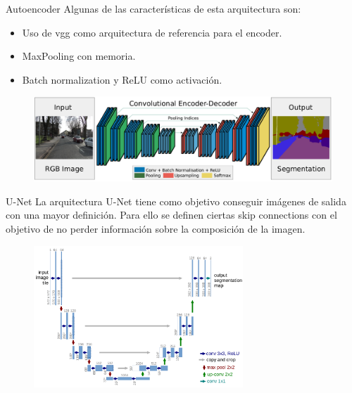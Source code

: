 \begin{frame}{Autoencoder}
Algunas de las características de esta arquitectura son:
\begin{itemize}
    \item Uso de \alert{\gls{vgg}} como arquitectura de referencia para el \alert{encoder}.
    \item MaxPooling \alert{con memoria}.
    \item \alert{Batch normalization} y \alert{ReLU} como activación.
\end{itemize}

\begin{figure}
    \centering
    \includegraphics[width=\textwidth]{figures/Tema 4/SegNet.png}
    \caption{\cite{badrinarayanan2015segnet}}
\end{figure}
\end{frame}

\begin{frame}{U-Net}
La arquitectura \alert{U-Net}\cite{ronneberger2015u} tiene como objetivo conseguir \alert{imágenes de salida} con una mayor definición. Para ello se definen ciertas \alert{skip connections} con el objetivo de no \alert{perder información} sobre la composición de la imagen.

\begin{figure}
    \centering
    \includegraphics[width=0.7\textwidth]{figures/Tema 4/U-Net.png}
    \caption{\cite{ronneberger2015u}}
\end{figure}
\end{frame}

